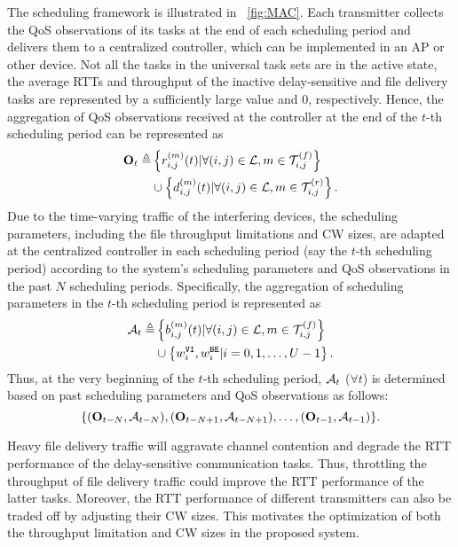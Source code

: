 The scheduling framework is illustrated in \figurename~\ref{fig:MAC}. Each transmitter collects the QoS observations of its tasks at the end of each scheduling period and delivers them to a centralized controller, which can be implemented in an AP or other device. Not all the tasks in the universal task sets are in the active state, the average RTTs and throughput of the inactive delay-sensitive and file delivery tasks are represented by a sufficiently large value and $0$, respectively. Hence, the aggregation of QoS observations received at the controller at the end of the $t$-th scheduling period can be represented as
\begin{align}
    \begin{split}
        \mathbf{O}_{t} \triangleq & \left\{r_{i,j}^{(m)}(t) |\forall (i,j) \in{\mathcal{L}},{m} \in{\mathcal{T}_{i,j}^{(f)}} \right\} \\ &\cup  \left\{d_{i,j}^{(m)}(t)| \forall (i,j) \in{\mathcal{L}},{m} \in{\mathcal{T}_{i,j}^{(r)}} \right\}.
    \end{split}
\end{align}
Due to the time-varying traffic of the interfering devices, the scheduling parameters, including the file throughput limitations and CW sizes, are adapted at the centralized controller in each scheduling period (say the $t$-th scheduling period) according to the system's scheduling parameters and QoS observations in the past $N$ scheduling periods. Specifically, the aggregation of scheduling parameters in the $t$-th scheduling period is represented as
\begin{align}
    \label{eq:action}
    \begin{split}
        \mathcal{A}_t \triangleq & \left\{ {b}_{i,j}^{(m)}(t) | \forall (i,j) \in{\mathcal{L}},{m} \in{\mathcal{T}_{i,j}^{(f)}} \right\} \\ &\cup  \left\{ w_{i}^{\mathtt{VI}}, w_{i}^{\mathtt{BE}} | i = 0, 1, \ldots, U-1 \right\}.
    \end{split}
\end{align}
Thus, at the very beginning of the $t$-th scheduling period, $\mathcal{A}_t$  ($\forall t$) is determined based on past scheduling parameters and QoS observations as follows:
\begin{equation}
    \{ (\mathbf{O}_{t-N},\mathcal{A}_{t-N}),(\mathbf{O}_{t-N+1},\mathcal{A}_{t-N+1}),\ldots,(\mathbf{O}_{t-1},\mathcal{A}_{t-1})\}.\nonumber
\end{equation}

\begin{remark}
    Heavy file delivery traffic will aggravate channel contention and degrade the RTT performance of the delay-sensitive communication tasks. Thus, throttling the throughput of file delivery traffic could improve the RTT performance of the latter tasks. Moreover, the RTT performance of different transmitters can also be traded off by adjusting their CW sizes. This motivates the optimization of both the throughput limitation and CW sizes in the proposed {\algName} system.
\end{remark}

